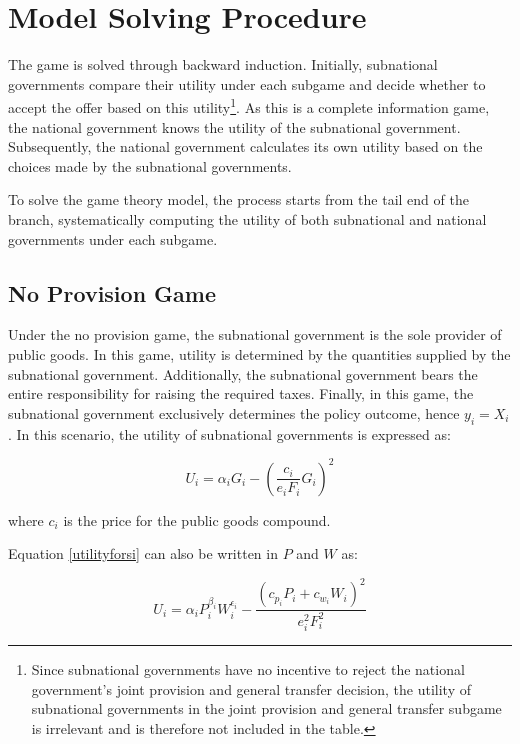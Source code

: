 \documentclass[man]{apa7}
\begin{document}
\section{Model Solving Procedure}

The game is solved through backward induction. Initially, subnational governments compare their utility under each subgame and decide whether to accept the offer based on this utility\footnote{Since subnational governments have no incentive to reject the national government's joint provision and general transfer decision, the utility of subnational governments in the joint provision and general transfer subgame is irrelevant and is therefore not included in the table.}. As this is a complete information game, the national government knows the utility of the subnational government. Subsequently, the national government calculates its own utility based on the choices made by the subnational governments.

To solve the game theory model, the process starts from the tail end of the branch, systematically computing the utility of both subnational and national governments under each subgame.%

\subsection{No Provision Game}

Under the no provision game, the subnational government is the sole provider of public goods. In this game, utility is determined by the quantities supplied by the subnational government. Additionally, the subnational government bears the entire responsibility for raising the required taxes. Finally, in this game, the subnational government exclusively determines the policy outcome, hence $y_i=X_i$. In this scenario, the utility of subnational governments is expressed as:

\begin{equation}
  U_i=\alpha_i G_i-\left(\frac{c_i}{e_i F_i} G_i\right)^2 \label{utilityforsi}
\end{equation}

where $c_i$ is the price for the public goods compound.

Equation \ref{utilityforsi} can also be written in $P$ and $W$ as:

\begin{equation}
  U_i=\alpha_i P_i^{\beta_i}W_i^{\epsilon_i}-\frac{(c_{p_i}P_i+c_{w_i}W_i)^2}{e_i^2 F_i^2}
\end{equation}
\end{document}

